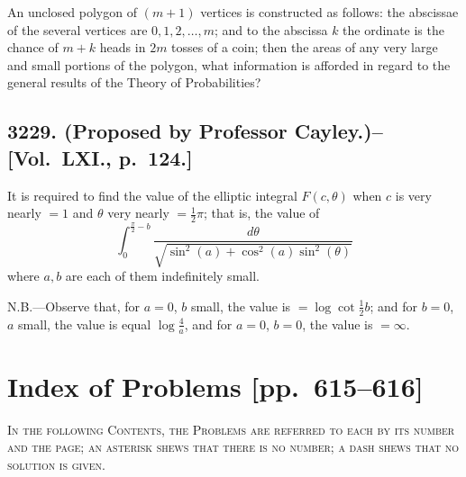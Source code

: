 \documentclass[11pt,a4paper]{article}
\theoremstyle{definition}
\begin{document}
An unclosed polygon of $(m+1)$ vertices is constructed as follows: the abscissae of the several vertices are $0,1,2,\ldots,m$; and to the abscissa $k$ the ordinate is the chance of $m+k$ heads in $2m$ tosses of a coin; then the areas of any very large and small portions of the polygon, what information is afforded in regard to the general results of the Theory of Probabilities?

\subsection*{3229. (Proposed by Professor Cayley.)\---[Vol.~LXI., p.~124.]}

It is required to find the value of the elliptic integral $F(c,\theta)$ when $c$ is very nearly $=1$ and $\theta$ very nearly $=\frac{1}{2}\pi$; that is, the value of
\[
\int_0^{\frac{\pi}{2}-b} \frac{d\theta}{\sqrt{\sin^2(a)+\cos^2(a)\sin^2(\theta)}}
\]
where $a,b$ are each of them indefinitely small.

\textsc{N.B.}---Observe that, for $a=0$, $b$ small, the value is $=\log\cot\frac{1}{2}b$; and for $b=0$, $a$ small, the value is equal $\log\frac{4}{a}$, and for $a=0$, $b=0$, the value is $=\infty$.

\newpage

\section*{Index of Problems [pp.~615--616]}

\begin{center}
\textsc{In the following Contents, the Problems are referred to each by its number and the page; an asterisk shews that there is no number; a dash shews that no solution is given.}
\end{center}

\medskip
\end{document}
